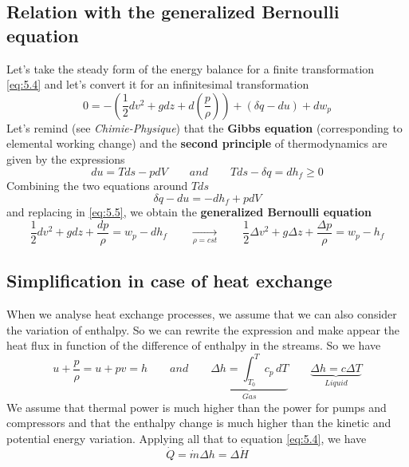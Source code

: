 	\subsection{Relation with the generalized Bernoulli equation}
		Let's take the steady form of the energy balance for a finite transformation \autoref{eq:5.4} and let's convert it for an infinitesimal transformation 
		\begin{equation}
			0 = - \left( \frac{1}{2}dv^2 + g dz + d\left(\frac{p}{\rho}\right) \right) + (\delta q - du) + dw_p
			\label{eq:5.5}
		\end{equation}
		Let's remind (see \emph{Chimie-Physique}) that the \textbf{Gibbs equation} (corresponding to elemental working change) and the \textbf{second principle} of thermodynamics are given by the expressions
		\begin{equation}
			du = Tds - pdV \qquad and \qquad Tds - \delta q= dh_f \geq 0
		\end{equation}
		Combining the two equations around $Tds$
		\begin{equation}
			\delta q - du = -dh_f + pdV
		\end{equation}
		and replacing in \autoref{eq:5.5}, we obtain the \textbf{generalized Bernoulli equation}
		\begin{equation}
			\frac{1}{2}dv^2 + g dz + \frac{dp}{\rho} = w_p - dh_f \qquad
			 \underset{\rho = cst}{\longrightarrow} \qquad 
			 \frac{1}{2}\Delta v^2 + g \Delta z + \frac{\Delta p}{\rho} = w_p - h_f 
		\end{equation}
		
	\subsection{Simplification in case of heat exchange}
		When we analyse heat exchange processes, we assume that we can also consider the variation of enthalpy. So we can rewrite the expression and make appear the heat flux in function of the difference of enthalpy in the streams. So we have 
		\begin{equation}
			u + \frac{p}{\rho} = u + pv = h \qquad and \qquad \underbrace{\Delta h = \int _{T_0}^T c_p \, dT}_{Gas} \qquad \underbrace{\Delta h = c\Delta T}_{Liquid}
		\end{equation}
		We assume that thermal power is much higher than the power for pumps and compressors and that the enthalpy change is much higher than the kinetic and potential energy variation. Applying all that to equation \autoref{eq:5.4}, we have
		\begin{equation}
			\dot{Q} = \dot{m}\Delta h = \Delta \dot{H}
		\end{equation}
		
